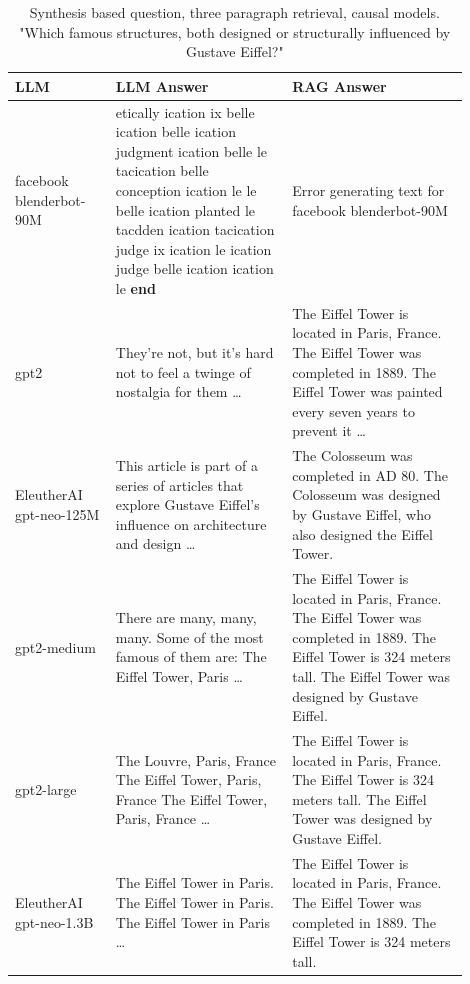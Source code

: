 \documentclass{wseas}
\begin{document}
\begin{table}[htbp]
  \centering
  \caption{Synthesis based question, three paragraph retrieval, causal models. "Which famous structures, both designed or structurally influenced by Gustave Eiffel?"} %
  \label{tab:experiment_R_3_paragraph_Q_synthesis_M_causal_table}  %
  \begin{tabular}{|p{0.20\linewidth}|p{0.35\linewidth}|p{0.35\linewidth}|}
    \hline
    \textbf{LLM} & \textbf{LLM Answer} & \textbf{RAG Answer} \\
    \hline
    facebook blenderbot-90M & etically ication ix belle ication belle ication judgment ication belle le tacication belle conception ication le le belle ication planted le tacdden ication tacication judge ix ication le ication judge belle ication ication le \textbf{end} & Error generating text for facebook blenderbot-90M \\
    \hline
    gpt2 & They're not, but it's hard not to feel a twinge of nostalgia for them \ldots{} & The Eiffel Tower is located in Paris, France. The Eiffel Tower was completed in 1889. The Eiffel Tower was painted every seven years to prevent it \ldots{} \\
    \hline
    EleutherAI gpt-neo-125M & This article is part of a series of articles that explore Gustave Eiffel's influence on architecture and design \ldots{} & The Colosseum was completed in AD 80. The Colosseum was designed by Gustave Eiffel, who also designed the Eiffel Tower. \\
    \hline
    gpt2-medium & There are many, many, many. Some of the most famous of them are: The Eiffel Tower, Paris \ldots{} & The Eiffel Tower is located in Paris, France. The Eiffel Tower was completed in 1889. The Eiffel Tower is 324 meters tall. The Eiffel Tower was designed by Gustave Eiffel. \\
    \hline
    gpt2-large & The Louvre, Paris, France The Eiffel Tower, Paris, France The Eiffel Tower, Paris, France \ldots{} & The Eiffel Tower is located in Paris, France. The Eiffel Tower is 324 meters tall. The Eiffel Tower was designed by Gustave Eiffel. \\
    \hline
    EleutherAI gpt-neo-1.3B & The Eiffel Tower in Paris. The Eiffel Tower in Paris. The Eiffel Tower in Paris \ldots{} & The Eiffel Tower is located in Paris, France. The Eiffel Tower was completed in 1889. The Eiffel Tower is 324 meters tall. \\
    \hline
  \end{tabular}
\end{table}
\end{document}
